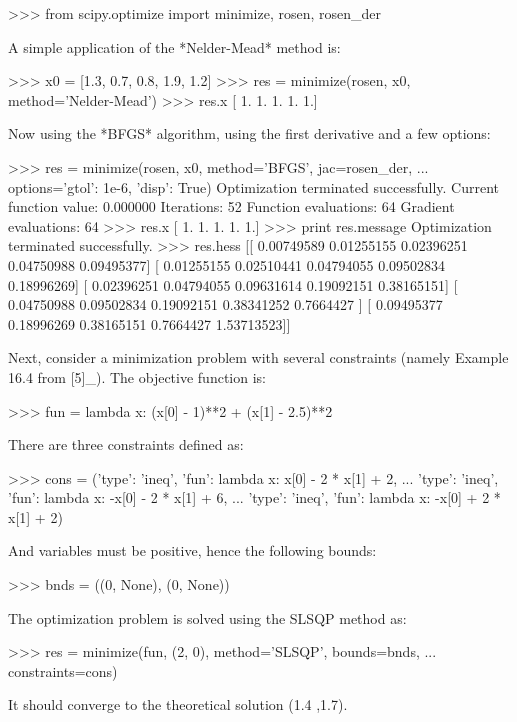 \begin{DoxyVerb}
>>> from scipy.optimize import minimize, rosen, rosen_der

A simple application of the *Nelder-Mead* method is:

>>> x0 = [1.3, 0.7, 0.8, 1.9, 1.2]
>>> res = minimize(rosen, x0, method='Nelder-Mead')
>>> res.x
[ 1.  1.  1.  1.  1.]

Now using the *BFGS* algorithm, using the first derivative and a few
options:

>>> res = minimize(rosen, x0, method='BFGS', jac=rosen_der,
...                options={'gtol': 1e-6, 'disp': True})
Optimization terminated successfully.
         Current function value: 0.000000
         Iterations: 52
         Function evaluations: 64
         Gradient evaluations: 64
>>> res.x
[ 1.  1.  1.  1.  1.]
>>> print res.message
Optimization terminated successfully.
>>> res.hess
[[ 0.00749589  0.01255155  0.02396251  0.04750988  0.09495377]
 [ 0.01255155  0.02510441  0.04794055  0.09502834  0.18996269]
 [ 0.02396251  0.04794055  0.09631614  0.19092151  0.38165151]
 [ 0.04750988  0.09502834  0.19092151  0.38341252  0.7664427 ]
 [ 0.09495377  0.18996269  0.38165151  0.7664427   1.53713523]]


Next, consider a minimization problem with several constraints (namely
Example 16.4 from [5]_). The objective function is:

>>> fun = lambda x: (x[0] - 1)**2 + (x[1] - 2.5)**2

There are three constraints defined as:

>>> cons = ({'type': 'ineq', 'fun': lambda x:  x[0] - 2 * x[1] + 2},
...         {'type': 'ineq', 'fun': lambda x: -x[0] - 2 * x[1] + 6},
...         {'type': 'ineq', 'fun': lambda x: -x[0] + 2 * x[1] + 2})

And variables must be positive, hence the following bounds:

>>> bnds = ((0, None), (0, None))

The optimization problem is solved using the SLSQP method as:

>>> res = minimize(fun, (2, 0), method='SLSQP', bounds=bnds,
...                constraints=cons)

It should converge to the theoretical solution (1.4 ,1.7).\end{DoxyVerb}
 \hypertarget{namespacescipy_1_1optimize_1_1__minimize_a60ede66cb5e138f729a9ea84348e2944}{}
